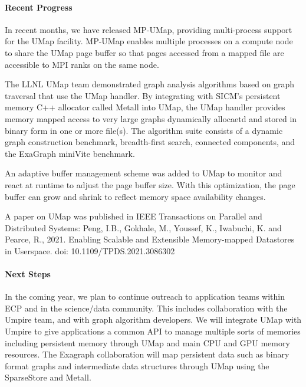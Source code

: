 \paragraph{Recent Progress}

In recent months, we have released MP-UMap, providing multi-process
support for the UMap facility. MP-UMap enables multiple processes on a
compute node to share the UMap page buffer so that pages accessed from
a mapped file are accessible to MPI ranks on the same node. 

The LLNL UMap team demonstrated graph analysis algorithms based on
graph traversal that use the UMap handler.  By integrating with SICM’s
persistent memory C++ allocator called Metall into UMap, the UMap
handler provides memory mapped access to very large graphs dynamically
allocaetd and stored in binary form in one or more file(s). The
algorithm suite consists of a dynamic graph construction benchmark,
breadth-first search, connected components, and the ExaGraph miniVite
benchmark.

An adaptive buffer management scheme was added to UMap to monitor and
react at runtime to adjust the page buffer size. With this
optimization, the page buffer can grow and shrink to reflect memory
space availability changes.

A paper on UMap was published in IEEE Transactions on Parallel and
Distributed Systems:  Peng, I.B., Gokhale, M., Youssef, K., Iwabuchi, K. and Pearce, R., 2021. Enabling Scalable and Extensible Memory-mapped Datastores in Userspace. doi: 10.1109/TPDS.2021.3086302

\paragraph{Next Steps}
In the coming year, we plan to continue outreach to application teams
within ECP and in the science/data community. This includes
collaboration with the Umpire team, and with graph algorithm
developers. We will integrate UMap with Umpire to give applications a
common API to manage multiple sorts of memories including persistent
memory through UMap and main CPU and GPU memory resources. The
Exagraph collaboration will map persistent data such as binary format
graphs and intermediate data structures through UMap using the
SparseStore and Metall.

